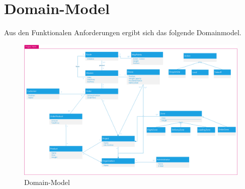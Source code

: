 \section{Domain-Model}

Aus den Funktionalen Anforderungen ergibt sich das folgende Domainmodel.

\begin{figure}[h]
	\includegraphics[width=1.0\textwidth]{images/domainmodell.png}
	\caption{Domain-Model}
	\label{fig:domain-model}
\end{figure}

